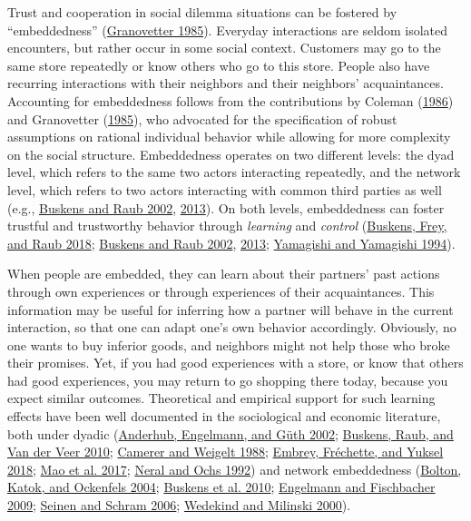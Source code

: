 \documentclass[
  11pt,
]{article}
\begin{document}
Trust and cooperation in social dilemma situations can be fostered by ``embeddedness'' (\protect\hyperlink{ref-granovetter_economic_1985}{Granovetter 1985}).
Everyday interactions are seldom isolated encounters, but rather occur in some social context.
Customers may go to the same store repeatedly or know others who go to this store.
People also have recurring interactions with their neighbors and their neighbors' acquaintances.
Accounting for embeddedness follows from the contributions by Coleman (\protect\hyperlink{ref-coleman_structure_1986}{1986}) and Granovetter (\protect\hyperlink{ref-granovetter_economic_1985}{1985}), who advocated for the specification of robust assumptions on rational individual behavior while allowing for more complexity on the social structure.
Embeddedness operates on two different levels: the dyad level, which refers to the same two actors interacting repeatedly, and the network level, which refers to two actors interacting with common third parties as well (e.g., \protect\hyperlink{ref-buskens_raub_embedded_2002}{Buskens and Raub 2002}, \protect\hyperlink{ref-buskens_raub_handbook_2013}{2013}).
On both levels, embeddedness can foster trustful and trustworthy behavior through \emph{learning} and \emph{control} (\protect\hyperlink{ref-buskens2018trust}{Buskens, Frey, and Raub 2018}; \protect\hyperlink{ref-buskens_raub_embedded_2002}{Buskens and Raub 2002}, \protect\hyperlink{ref-buskens_raub_handbook_2013}{2013}; \protect\hyperlink{ref-yamagishi_yamagishi_trust_1994}{Yamagishi and Yamagishi 1994}).

When people are embedded, they can learn about their partners' past actions through own experiences or through experiences of their acquaintances.
This information may be useful for inferring how a partner will behave in the current interaction, so that one can adapt one's own behavior accordingly.
Obviously, no one wants to buy inferior goods, and neighbors might not help those who broke their promises.
Yet, if you had good experiences with a store, or know that others had good experiences, you may return to go shopping there today, because you expect similar outcomes.
Theoretical and empirical support for such learning effects have been well documented in the sociological and economic literature, both under dyadic (\protect\hyperlink{ref-anderhub_repeated_trust_2002}{Anderhub, Engelmann, and Güth 2002}; \protect\hyperlink{ref-buskens_raub_veer_triads_2010}{Buskens, Raub, and Van der Veer 2010}; \protect\hyperlink{ref-camerer_weigelt_sequential_1988}{Camerer and Weigelt 1988}; \protect\hyperlink{ref-embrey_etal_cooperation_2018}{Embrey, Fréchette, and Yuksel 2018}; \protect\hyperlink{ref-mao_resilient_cooperators_2017}{Mao et al. 2017}; \protect\hyperlink{ref-neral_ochs_sequential_1992}{Neral and Ochs 1992}) and network embeddedness (\protect\hyperlink{ref-bolton_electronic_2004}{Bolton, Katok, and Ockenfels 2004}; \protect\hyperlink{ref-buskens_raub_veer_triads_2010}{Buskens et al. 2010}; \protect\hyperlink{ref-engelmann_firschbacher_2009}{Engelmann and Fischbacher 2009}; \protect\hyperlink{ref-seinen_schram_social_2006}{Seinen and Schram 2006}; \protect\hyperlink{ref-wedekind_milinski_2000}{Wedekind and Milinski 2000}).
\end{document}
